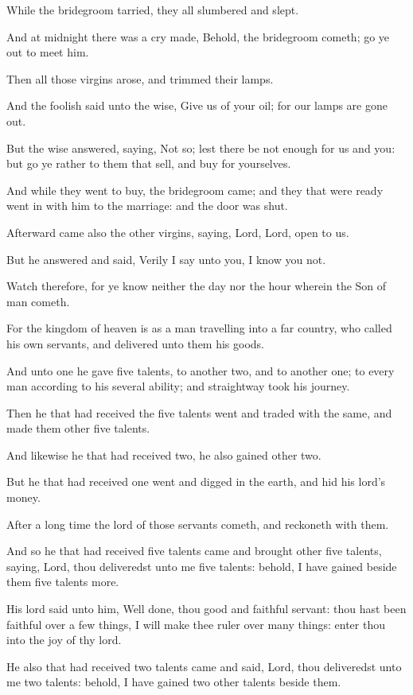 \Verse While the bridegroom tarried, they all slumbered and slept.

\Verse And at midnight there was a cry made, Behold, the bridegroom cometh; go ye out to meet him.

\Verse Then all those virgins arose, and trimmed their lamps.

\Verse And the foolish said unto the wise, Give us of your oil; for our lamps are gone out.

\Verse But the wise answered, saying, Not so; lest there be not enough for us and you: but go ye rather to them that sell, and buy for yourselves.

\Verse And while they went to buy, the bridegroom came; and they that were ready went in with him to the marriage: and the door was shut.

\Verse Afterward came also the other virgins, saying, Lord, Lord, open to us.

\Verse But he answered and said, Verily I say unto you, I know you not.

\Verse Watch therefore, for ye know neither the day nor the hour wherein the Son of man cometh.

\Verse For the kingdom of heaven is as a man travelling into a far country, who called his own servants, and delivered unto them his goods.

\Verse And unto one he gave five talents, to another two, and to another one; to every man according to his several ability; and straightway took his journey.

\Verse Then he that had received the five talents went and traded with the same, and made them other five talents.

\Verse And likewise he that had received two, he also gained other two.

\Verse But he that had received one went and digged in the earth, and hid his lord's money.

\Verse After a long time the lord of those servants cometh, and reckoneth with them.

\Verse And so he that had received five talents came and brought other five talents, saying, Lord, thou deliveredst unto me five talents: behold, I have gained beside them five talents more.

\Verse His lord said unto him, Well done, thou good and faithful servant: thou hast been faithful over a few things, I will make thee ruler over many things: enter thou into the joy of thy lord.

\Verse He also that had received two talents came and said, Lord, thou deliveredst unto me two talents: behold, I have gained two other talents beside them.


